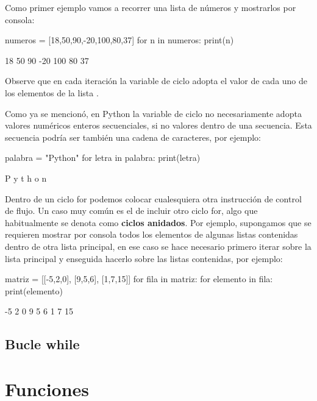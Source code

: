 Como primer ejemplo vamos a recorrer una lista de números y mostrarlos por consola:

\begin{python}
numeros = [18,50,90,-20,100,80,37]
for n in numeros:
    print(n)
\end{python}
\begin{outscript}
18
50
90
-20
100
80
37
\end{outscript}

Observe que en cada iteración la variable de ciclo  adopta el valor de cada uno de los elementos de la 
lista .

Como ya se mencionó, en Python la variable de ciclo no necesariamente adopta valores numéricos enteros secuenciales, 
si no valores dentro de una secuencia. Esta secuencia podría ser también una cadena de caracteres, por ejemplo:

\begin{python}
palabra = "Python"
for letra in palabra:
    print(letra)
\end{python}
\begin{outscript}
P
y
t
h
o
n
\end{outscript}

Dentro de un ciclo for podemos colocar cualesquiera otra instrucción de control de flujo. Un caso 
muy común es el de incluir otro ciclo for, algo que habitualmente se denota como \textbf{ciclos anidados}. 
Por ejemplo, supongamos que se requieren mostrar por consola todos los elementos de algunas listas contenidas 
dentro de otra lista principal, en ese caso se hace necesario primero iterar sobre la lista principal y 
enseguida hacerlo sobre las listas contenidas, por ejemplo:

\begin{python}
matriz = [[-5,2,0], [9,5,6], [1,7,15]]
for fila in matriz:
    for elemento in fila:
        print(elemento)
\end{python}
\begin{outscript}
-5
2
0
9
5
6
1
7
15
\end{outscript}




\subsection{Bucle while}



\section{Funciones}

